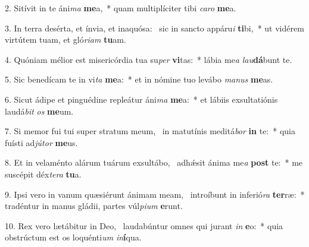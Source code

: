 2. Sitívit in te áni\textit{ma} \textbf{me}a,~*  quam multiplíciter tibi \textit{ca}\textit{ro} \textbf{me}a.\

3. In terra desérta, et ínvia, et inaquósa: \dag\  sic in sancto appáru\textit{i} \textbf{ti}bi,~*  ut vidérem virtútem tuam, et gló\textit{ri}\textit{am} \textbf{tu}am.\

4. Quóniam mélior est misericórdia tua su\textit{per} \textbf{vi}tas:~*  lábia me\textit{a} \textit{lau}\textbf{dá}bunt te.\

5. Sic benedícam te in vi\textit{ta} \textbf{me}a:~*  et in nómine tuo levábo \textit{ma}\textit{nus} \textbf{me}as.\

6. Sicut ádipe et pinguédine repleátur áni\textit{ma} \textbf{me}a:~*  et lábiis exsultatiónis laudá\textit{bit} \textit{os} \textbf{me}um.\

7. Si memor fui tui super stratum meum, \dag\  in matutínis meditá\textit{bor} \textbf{in} te:~*  quia fuísti ad\textit{jú}\textit{tor} \textbf{me}us.\

8. Et in velaménto alárum tuárum exsultábo, \dag\  adhǽsit ánima me\textit{a} \textbf{post} te:~*  me suscépit déx\textit{te}\textit{ra} \textbf{tu}a.\

9. Ipsi vero in vanum quæsiérunt ánimam meam, \dag\  introíbunt in inferió\textit{ra} \textbf{ter}ræ:~*  tradéntur in manus gládii, partes vúl\textit{pi}\textit{um} \textbf{e}runt.\

10. Rex vero lætábitur in Deo, \dag\  laudabúntur omnes qui jurant \textit{in} \textbf{e}o:~*  quia obstrúctum est os loquénti\textit{um} \textit{in}\textbf{í}qua.\


